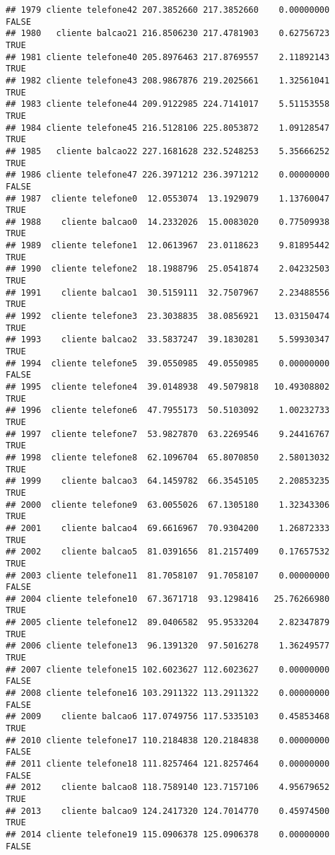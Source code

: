 \documentclass[
]{article}
\begin{document}
\begin{verbatim}
## 1979 cliente telefone42 207.3852660 217.3852660    0.00000000    FALSE
## 1980   cliente balcao21 216.8506230 217.4781903    0.62756723     TRUE
## 1981 cliente telefone40 205.8976463 217.8769557    2.11892143     TRUE
## 1982 cliente telefone43 208.9867876 219.2025661    1.32561041     TRUE
## 1983 cliente telefone44 209.9122985 224.7141017    5.51153558     TRUE
## 1984 cliente telefone45 216.5128106 225.8053872    1.09128547     TRUE
## 1985   cliente balcao22 227.1681628 232.5248253    5.35666252     TRUE
## 1986 cliente telefone47 226.3971212 236.3971212    0.00000000    FALSE
## 1987  cliente telefone0  12.0553074  13.1929079    1.13760047     TRUE
## 1988    cliente balcao0  14.2332026  15.0083020    0.77509938     TRUE
## 1989  cliente telefone1  12.0613967  23.0118623    9.81895442     TRUE
## 1990  cliente telefone2  18.1988796  25.0541874    2.04232503     TRUE
## 1991    cliente balcao1  30.5159111  32.7507967    2.23488556     TRUE
## 1992  cliente telefone3  23.3038835  38.0856921   13.03150474     TRUE
## 1993    cliente balcao2  33.5837247  39.1830281    5.59930347     TRUE
## 1994  cliente telefone5  39.0550985  49.0550985    0.00000000    FALSE
## 1995  cliente telefone4  39.0148938  49.5079818   10.49308802     TRUE
## 1996  cliente telefone6  47.7955173  50.5103092    1.00232733     TRUE
## 1997  cliente telefone7  53.9827870  63.2269546    9.24416767     TRUE
## 1998  cliente telefone8  62.1096704  65.8070850    2.58013032     TRUE
## 1999    cliente balcao3  64.1459782  66.3545105    2.20853235     TRUE
## 2000  cliente telefone9  63.0055026  67.1305180    1.32343306     TRUE
## 2001    cliente balcao4  69.6616967  70.9304200    1.26872333     TRUE
## 2002    cliente balcao5  81.0391656  81.2157409    0.17657532     TRUE
## 2003 cliente telefone11  81.7058107  91.7058107    0.00000000    FALSE
## 2004 cliente telefone10  67.3671718  93.1298416   25.76266980     TRUE
## 2005 cliente telefone12  89.0406582  95.9533204    2.82347879     TRUE
## 2006 cliente telefone13  96.1391320  97.5016278    1.36249577     TRUE
## 2007 cliente telefone15 102.6023627 112.6023627    0.00000000    FALSE
## 2008 cliente telefone16 103.2911322 113.2911322    0.00000000    FALSE
## 2009    cliente balcao6 117.0749756 117.5335103    0.45853468     TRUE
## 2010 cliente telefone17 110.2184838 120.2184838    0.00000000    FALSE
## 2011 cliente telefone18 111.8257464 121.8257464    0.00000000    FALSE
## 2012    cliente balcao8 118.7589140 123.7157106    4.95679652     TRUE
## 2013    cliente balcao9 124.2417320 124.7014770    0.45974500     TRUE
## 2014 cliente telefone19 115.0906378 125.0906378    0.00000000    FALSE

\end{verbatim}
\end{document}
